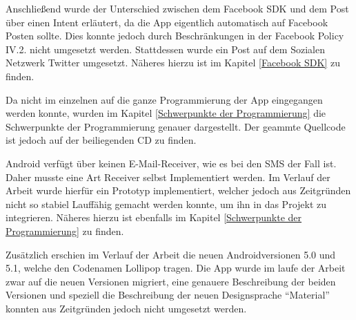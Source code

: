 Anschlie\ss{}end wurde der Unterschied zwischen dem Facebook \ac{SDK} und dem Post \"uber einen Intent erl\"autert, da die App eigentlich automatisch auf Facebook Posten sollte. Dies konnte jedoch durch Beschr\"ankungen in der Facebook Policy IV.2. nicht umgesetzt werden. Stattdessen wurde ein Post auf dem Sozialen Netzwerk Twitter umgesetzt. N\"aheres hierzu ist im Kapitel \ref{Facebook SDK} zu finden.

Da nicht im einzelnen auf die ganze Programmierung der App eingegangen werden konnte, wurden im Kapitel \ref{Schwerpunkte der Programmierung} die Schwerpunkte der Programmierung genauer dargestellt. Der geammte Quellcode ist jedoch auf der beiliegenden CD zu finden.

Android verf\"ugt \"uber keinen E-Mail-Receiver, wie es bei den SMS der Fall ist. Daher musste eine Art Receiver selbst Implementiert werden. Im Verlauf der Arbeit wurde hierf\"ur ein Prototyp implementiert, welcher jedoch aus Zeitgr\"unden nicht so stabiel Lauff\"ahig gemacht werden konnte, um ihn in das Projekt zu integrieren. N\"aheres hierzu ist ebenfalls im Kapitel \ref{Schwerpunkte der Programmierung} zu finden.

Zus\"atzlich erschien im Verlauf der Arbeit die neuen Androidversionen 5.0 und 5.1, welche den Codenamen Lollipop tragen. Die App wurde im laufe der Arbeit zwar auf die neuen Versionen migriert, eine genauere Beschreibung der beiden Versionen und speziell die Beschreibung der neuen Designsprache "`Material"' konnten aus Zeitgr\"unden jedoch nicht umgesetzt werden.

